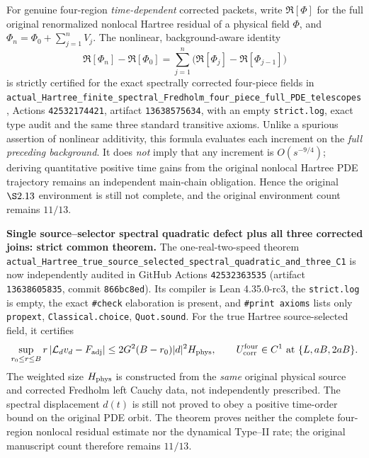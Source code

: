 \documentclass[11pt]{amsart}
\begin{document}
For genuine four-region \emph{time-dependent} corrected packets,
write
\(\mathfrak R[\Phi]\) for the full original renormalized
nonlocal Hartree residual of a physical field \(\Phi\), and
\(\Phi_n=\Phi_0+\sum_{j=1}^{n}V_j\).
The nonlinear, background-aware identity
\[
 \mathfrak R[\Phi_n]-\mathfrak R[\Phi_0]
 =\sum_{j=1}^{n}
    \bigl(\mathfrak R[\Phi_j]-\mathfrak R[\Phi_{j-1}]\bigr)
\]
is strictly certified for the exact spectrally corrected
four-piece fields in
\texttt{actual_Hartree_finite_spectral_Fredholm_four_piece_full_PDE_telescopes},
Actions \texttt{42532174421}, artifact \texttt{13638575634},
with an empty \texttt{strict.log}, exact type audit and the same
three standard transitive axioms. Unlike a spurious assertion
of nonlinear additivity, this formula evaluates each increment
on the \emph{full preceding background}. It does
\emph{not} imply that any increment is
\(O(s^{-9/4})\); deriving quantitative positive time gains
from the original nonlocal Hartree PDE trajectory remains an
independent main-chain obligation. Hence the original
\(\S2.13\) environment is still not complete, and
the original environment count remains \(11/13\).


\medskip
\noindent\textbf{Single source--selector spectral quadratic defect plus
all three corrected joins: strict common theorem.}
The one-real-two-speed theorem
\texttt{actual_Hartree_true_source_selected_spectral_quadratic_and_three_C1}
is now independently audited in GitHub Actions
\texttt{42532363535} (artifact \texttt{13638605835},
commit \texttt{866bc8ed}). Its compiler is Lean 4.35.0-rc3,
the \texttt{strict.log} is empty, the exact \texttt{\#check}
elaboration is present, and \texttt{\#print axioms} lists
only \texttt{propext}, \texttt{Classical.choice},
\texttt{Quot.sound}.
For the true Hartree source-selected field, it certifies
\[
 \sup_{r_0\le r\le B}
 r\left|\mathcal L_d v_d-F_{\rm adj}\right|
 \le 2G^2(B-r_0)|d|^2H_{\rm phys},
 \qquad
 U_{\rm corr}^{\rm four}\in C^1
       \text{ at } \{L,aB,2aB\}.
\]
The weighted size \(H_{\rm phys}\) is constructed from
the \emph{same} original physical source and corrected Fredholm
left Cauchy data, not independently prescribed.
The spectral displacement \(d(t)\) is still not proved to
obey a positive time-order bound on the original PDE orbit.
The theorem proves neither the complete four-region nonlocal
residual estimate nor the dynamical Type--II rate; the
original manuscript count therefore remains \(11/13\).
\end{document}
